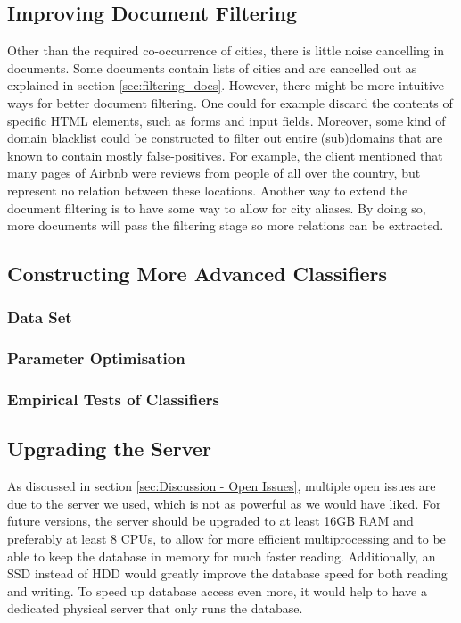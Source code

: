 \subsection{Improving Document Filtering}
Other than the required co-occurrence of cities, there is little noise cancelling in documents. Some documents contain lists of cities and are cancelled out as explained in section \ref{sec:filtering_docs}. However, there might be more intuitive ways for better document filtering. One could for example discard the contents of specific HTML elements, such as forms and input fields. Moreover, some kind of domain blacklist could be constructed to filter out entire (sub)domains that are known to contain mostly false-positives. For example, the client mentioned that many pages of Airbnb were reviews from people of all over the country, but represent no relation between these locations. Another way to extend the document filtering is to have some way to allow for city aliases. By doing so, more documents will pass the filtering stage so more relations can be extracted.

\subsection{Constructing More Advanced Classifiers}
\subsubsection{Data Set}
\subsubsection{Parameter Optimisation}
\subsubsection{Empirical Tests of Classifiers}

\subsection{Upgrading the Server}
As discussed in section \ref{sec:Discussion - Open Issues}, multiple open issues are due to the server we used, which is not as powerful as we would have liked. For future versions, the server should be upgraded to at least 16GB RAM and preferably at least 8 CPUs, to allow for more efficient multiprocessing and to be able to keep the database in memory for much faster reading. Additionally, an SSD instead of HDD would greatly improve the database speed for both reading and writing. To speed up database access even more, it would help to have a dedicated physical server that only runs the database.

